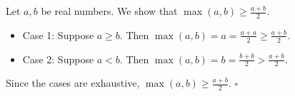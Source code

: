 Let $a, b$ be real numbers.
We show that $\max(a, b) \geq \frac{a + b}{2}$.

\begin{itemize}
  \item Case 1: Suppose $a \geq b$.
    Then $\max(a, b) = a = \frac{a + a}{2} \geq \frac{a + b}{2}$.
  \item Case 2: Suppose $a < b$.
    Then $\max(a, b) = b = \frac{b + b}{2} > \frac{a + b}{2}$.
\end{itemize}

Since the cases are exhaustive, $\max(a, b) \geq \frac{a + b}{2}$. \hfill$\square$